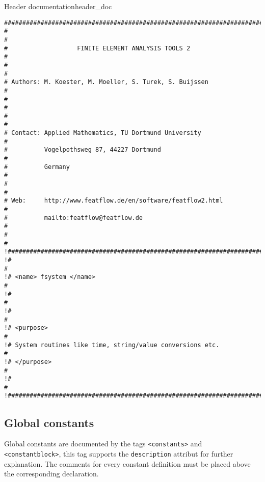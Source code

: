\begin{code}{Header documentation}{header_doc}
\begin{verbatim}
########################################################################
#                                                                      #
#                   FINITE ELEMENT ANALYSIS TOOLS 2                    #
#                                                                      #
# Authors: M. Koester, M. Moeller, S. Turek, S. Buijssen               #
#                                                                      #
#                                                                      #
# Contact: Applied Mathematics, TU Dortmund University                 #
#          Vogelpothsweg 87, 44227 Dortmund                            #
#          Germany                                                     #
#                                                                      #
# Web:     http://www.featflow.de/en/software/featflow2.html           #
#          mailto:featflow@featflow.de                                 #
#                                                                      #
!########################################################################
!#                                                                      #
!# <name> fsystem </name>                                               #
!#                                                                      #
!#                                                                      #
!# <purpose>                                                            #
!# System routines like time, string/value conversions etc.             #
!# </purpose>                                                           #
!#                                                                      #
!########################################################################
\end{verbatim}
\end{code}

\subsection{Global constants}


Global constants are documented by the tags \verb+<constants>+ and 
\verb+<constantblock>+, this tag supports the \verb+description+ attribut
for further explanation. The comments for every constant definition must
be placed above the corresponding declaration.

